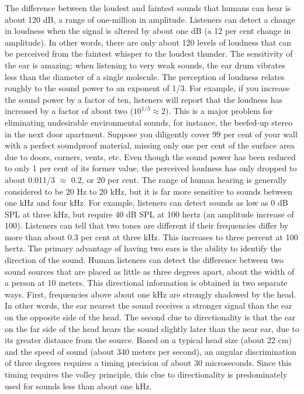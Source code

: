 The difference between the loudest and faintest sounds that humans can hear is about 120 dB, a range of one-million in amplitude. Listeners can detect a change in loudness when the signal is altered by about  one dB (a 12 per cent change in amplitude). In other words, there are only about 120 levels of loudness that can be perceived from the faintest whisper to the loudest thunder. The sensitivity of the ear is amazing; when listening to very weak sounds, the ear drum vibrates less than the diameter of a single molecule.
The perception of loudness relates roughly to the sound power to an exponent of 1/3. For example, if you increase the sound power by a factor of ten, listeners will report that the loudness has increased by a factor of about two ($10^{1/3}\approx 2$). This is a major problem for eliminating undesirable environmental sounds, for instance, the beefed-up stereo in the next door apartment. Suppose you diligently cover 99 per cent of your wall with a perfect soundproof material, missing only one per cent of the surface area due to doors, corners, vents, etc. Even though the sound power has been reduced to only 1 per cent of its former value, the perceived loudness has only dropped to about 0.011/3 $\approx$ 0.2, or 20 per cent. 
The range of human hearing is generally considered to be 20 Hz to 20 kHz, but it is far more sensitive to sounds between one kHz and four kHz. For example, listeners can detect sounds as low as 0 dB SPL at three kHz, but require 40 dB SPL at 100 hertz (an amplitude increase of 100). Listeners can tell that two tones are different if their frequencies differ by more than about 0.3 per cent at three kHz. This increases to three percent at 100 hertz. 
The primary advantage of having two ears is the ability to identify the direction of the sound. Human listeners can detect the difference between two sound sources that are placed as little as three degrees apart, about the width of a person at 10 meters. This directional information is obtained in two separate ways. First, frequencies above about one kHz are strongly shadowed by the head. In other words, the ear nearest the sound receives a stronger signal than the ear on the opposite side of the head. The second clue to directionality is that the ear on the far side of the head hears the sound slightly later than the near ear, due to its greater distance from the source. Based on a typical head size (about 22 cm) and the speed of sound (about 340 meters per second), an angular discrimination of three degrees requires a timing precision of about 30 microseconds. Since this timing requires the volley principle, this clue to directionality is predominately used for sounds less than about one kHz. 

